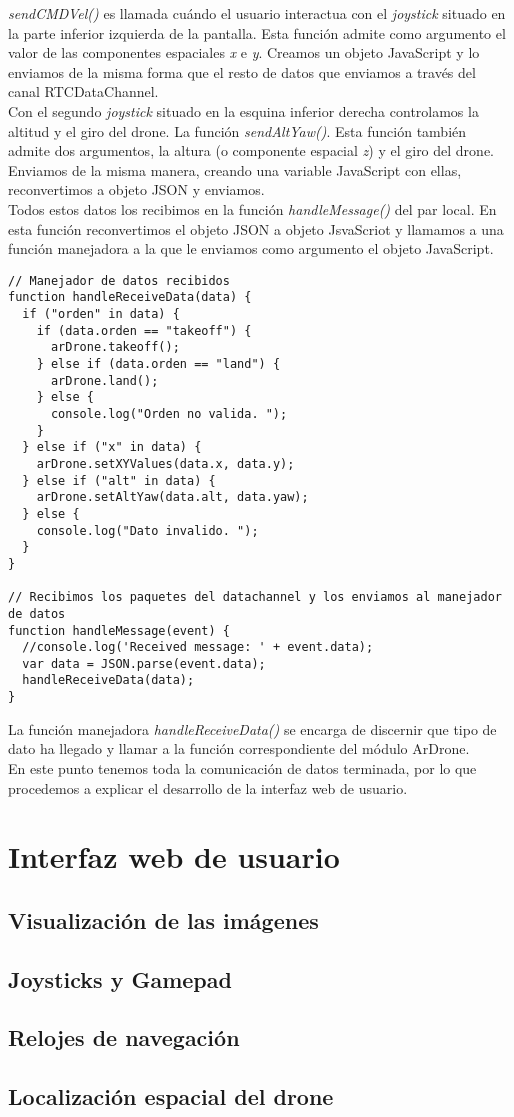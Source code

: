 \emph{sendCMDVel()} es llamada cuándo el usuario interactua con el \emph{joystick} situado en la parte inferior izquierda de la pantalla. Esta función admite como argumento el valor de las componentes espaciales \emph{x} e \emph{y}. Creamos un objeto JavaScript y lo enviamos de la misma forma que el resto de datos que enviamos a través del canal RTCDataChannel.\\

Con el segundo \emph{joystick} situado en la esquina inferior derecha controlamos la altitud y el giro del drone. La función \emph{sendAltYaw()}. Esta función también admite dos argumentos, la altura (o componente espacial \emph{z}) y el giro del drone. Enviamos de la misma manera, creando una variable JavaScript con ellas, reconvertimos a objeto JSON y enviamos.\\

Todos estos datos los recibimos en la función \emph{handleMessage()} del par local. En esta función reconvertimos el objeto JSON a objeto JsvaScriot y llamamos a una función manejadora a la que le enviamos como argumento el objeto JavaScript.\\

\begin{lstlisting}[caption=Manejo de las órdenes recibidas en el par local.]
// Manejador de datos recibidos 
function handleReceiveData(data) {
  if ("orden" in data) {
    if (data.orden == "takeoff") {
      arDrone.takeoff();
    } else if (data.orden == "land") {
      arDrone.land();
    } else {
      console.log("Orden no valida. ");
    }
  } else if ("x" in data) {
    arDrone.setXYValues(data.x, data.y);
  } else if ("alt" in data) {
    arDrone.setAltYaw(data.alt, data.yaw);
  } else {
    console.log("Dato invalido. ");
  }		
}

// Recibimos los paquetes del datachannel y los enviamos al manejador de datos
function handleMessage(event) {
  //console.log('Received message: ' + event.data);
  var data = JSON.parse(event.data);
  handleReceiveData(data);
}
\end{lstlisting}


La función manejadora \emph{handleReceiveData()} se encarga de discernir que tipo de dato ha llegado y llamar a la función correspondiente del módulo ArDrone.\\

En este punto tenemos toda la comunicación de datos terminada, por lo que procedemos a explicar el desarrollo de la interfaz web de usuario.\\

\section{Interfaz web de usuario}
\subsection{Visualización de las imágenes}
\subsection{Joysticks y Gamepad}\label{subsec:joysticks}
\subsection{Relojes de navegación}\label{subsec:relojesnavegacion}
\subsection{Localización espacial del drone}
